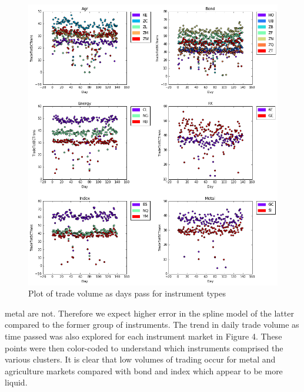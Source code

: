 \documentclass[12pt]{article}
\begin{document}
\begin{figure}[H]
	\begin{center}	
		\includegraphics[width=15cm]{agr_scatter_trans.png}
		\caption{Plot of trade volume as days pass for instrument types}
		\label{fig:3}
	\end{center}
\end{figure}

\noindent metal are not. Therefore we expect higher error in the spline model of the latter compared to the former group of instruments. The trend in daily trade volume as time passed was also explored for each instrument market in Figure 4.  These points were then color-coded to understand which instruments comprised the various clusters. It is clear that low volumes of trading occur for metal and agriculture markets compared with bond and index which appear to be more liquid. 
\end{document}
